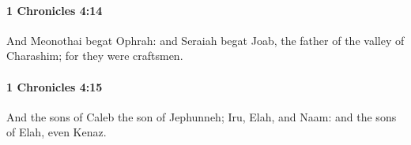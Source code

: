 		\paragraph{1 Chronicles 4:14} %
			\label{1CHRONICLES-4-14}

			And Meonothai begat Ophrah: and Seraiah begat Joab, the father of the valley of Charashim; for they were craftsmen.


		\paragraph{1 Chronicles 4:15} %
			\label{1CHRONICLES-4-15}

			And the sons of Caleb the son of Jephunneh; Iru, Elah, and Naam: and the sons of Elah, even Kenaz.


